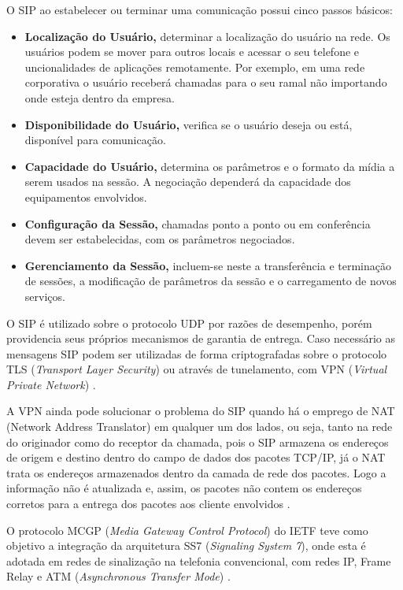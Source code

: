 O SIP ao estabelecer ou terminar uma comunicação possui cinco passos básicos:
\begin{itemize}
  \item \textbf{Localização do Usuário,} determinar a localização do usuário na rede. Os usuários podem se mover para outros locais e acessar o seu telefone e uncionalidades de aplicações remotamente. Por exemplo, em uma rede corporativa o usuário receberá chamadas para o seu ramal não importando onde esteja dentro da empresa.
  \item \textbf{Disponibilidade do Usuário,} verifica se o usuário deseja ou está, disponível para comunicação.
  \item \textbf{Capacidade do Usuário,} determina os parâmetros e o formato da mídia a serem usados na sessão. A negociação dependerá da capacidade dos equipamentos envolvidos.
  \item \textbf{Configuração da Sessão,} chamadas ponto a ponto ou em conferência devem ser estabelecidas, com os parâmetros negociados.
  \item \textbf{Gerenciamento da Sessão,} incluem-se neste a transferência e terminação de sessões, a modificação de parâmetros da sessão e o carregamento de novos serviços.
\end{itemize}

O SIP é utilizado sobre o protocolo UDP por razões de desempenho, porém providencia seus próprios mecanismos de garantia de entrega. Caso necessário as mensagens SIP podem ser utilizadas de forma criptografadas sobre o protocolo TLS (\textit{Transport Layer Security}) ou através de tunelamento, com VPN (\textit{Virtual Private Network}) \cite{davidson2008}.

A VPN ainda pode solucionar o problema do SIP quando há o emprego de NAT (Network Address Translator) em qualquer um dos lados, ou seja, tanto na rede do originador como do receptor da chamada, pois o SIP armazena os endereços de origem e destino dentro do campo de dados dos pacotes TCP/IP, já o NAT trata os endereços armazenados dentro da camada de rede dos pacotes. Logo a informação não é atualizada e, assim, os pacotes não contem os endereços corretos para a entrega dos pacotes aos cliente envolvidos \cite{alexandrekeller2014}.

O protocolo MCGP (\textit{Media Gateway Control Protocol}) do IETF teve como objetivo a integração da arquitetura SS7 (\textit{Signaling System 7}), onde esta é adotada em redes de sinalização na telefonia convencional, com redes IP, Frame Relay e ATM (\textit{Asynchronous Transfer Mode}) \cite{theodorewallingford2005}.

